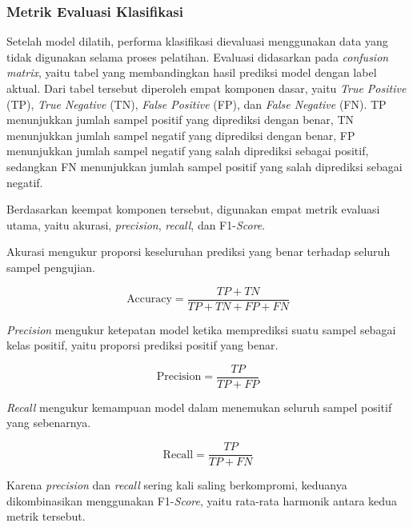 \subsubsection{Metrik Evaluasi Klasifikasi}

Setelah model dilatih, performa klasifikasi dievaluasi menggunakan data
yang tidak digunakan selama proses pelatihan. Evaluasi didasarkan pada
\textit{confusion matrix}, yaitu tabel yang membandingkan hasil prediksi
model dengan label aktual. Dari tabel tersebut diperoleh empat komponen
dasar, yaitu \textit{True Positive} (TP), \textit{True Negative} (TN),
\textit{False Positive} (FP), dan \textit{False Negative} (FN). TP
menunjukkan jumlah sampel positif yang diprediksi dengan benar, TN
menunjukkan jumlah sampel negatif yang diprediksi dengan benar, FP
menunjukkan jumlah sampel negatif yang salah diprediksi sebagai positif,
sedangkan FN menunjukkan jumlah sampel positif yang salah diprediksi
sebagai negatif.

Berdasarkan keempat komponen tersebut, digunakan empat metrik evaluasi
utama, yaitu akurasi, \textit{precision}, \textit{recall}, dan
F1-\textit{Score}.

Akurasi mengukur proporsi keseluruhan prediksi yang benar terhadap seluruh
sampel pengujian.

\begin{equation}
    \text{Accuracy} =
    \frac{TP + TN}{TP + TN + FP + FN}
    \label{eq:accuracy}
\end{equation}

\textit{Precision} mengukur ketepatan model ketika memprediksi suatu
sampel sebagai kelas positif, yaitu proporsi prediksi positif yang benar.

\begin{equation}
    \text{Precision} =
    \frac{TP}{TP + FP}
    \label{eq:precision}
\end{equation}

\textit{Recall} mengukur kemampuan model dalam menemukan seluruh sampel
positif yang sebenarnya.

\begin{equation}
    \text{Recall} =
    \frac{TP}{TP + FN}
    \label{eq:recall}
\end{equation}

Karena \textit{precision} dan \textit{recall} sering kali saling
berkompromi, keduanya dikombinasikan menggunakan F1-\textit{Score},
yaitu rata-rata harmonik antara kedua metrik tersebut.

